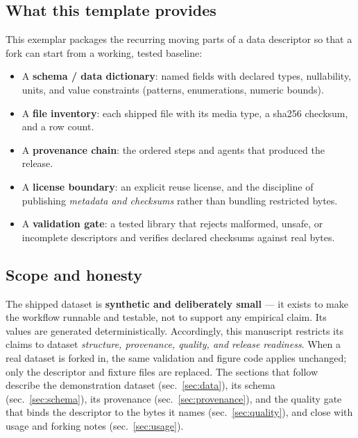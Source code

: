 \documentclass[
]{article}
\providecommand{\tightlist}{%
  \setlength{\itemsep}{0pt}\setlength{\parskip}{0pt}}
\begin{document}
\subsection{What this template
provides}\label{what-this-template-provides}

This exemplar packages the recurring moving parts of a data descriptor
so that a fork can start from a working, tested baseline:

\begin{itemize}
\tightlist
\item
  A \textbf{schema / data dictionary}: named fields with declared types,
  nullability, units, and value constraints (patterns, enumerations,
  numeric bounds).
\item
  A \textbf{file inventory}: each shipped file with its media type, a
  sha256 checksum, and a row count.
\item
  A \textbf{provenance chain}: the ordered steps and agents that
  produced the release.
\item
  A \textbf{license boundary}: an explicit reuse license, and the
  discipline of publishing \emph{metadata and checksums} rather than
  bundling restricted bytes.
\item
  A \textbf{validation gate}: a tested library that rejects malformed,
  unsafe, or incomplete descriptors and verifies declared checksums
  against real bytes.
\end{itemize}

\subsection{Scope and honesty}\label{scope-and-honesty}

The shipped dataset is \textbf{synthetic and deliberately small} --- it
exists to make the workflow runnable and testable, not to support any
empirical claim. Its values are generated deterministically.
Accordingly, this manuscript restricts its claims to dataset
\emph{structure, provenance, quality, and release readiness}. When a
real dataset is forked in, the same validation and figure code applies
unchanged; only the descriptor and fixture files are replaced. The
sections that follow describe the demonstration dataset
(sec.~\ref{sec:data}), its schema (sec.~\ref{sec:schema}), its
provenance (sec.~\ref{sec:provenance}), and the quality gate that binds
the descriptor to the bytes it names (sec.~\ref{sec:quality}), and close
with usage and forking notes (sec.~\ref{sec:usage}).
\end{document}
